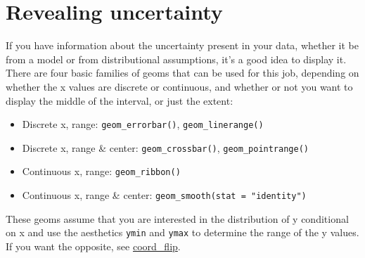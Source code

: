 \hypertarget{sec:uncertainty}{\section{Revealing
uncertainty}\label{sec:uncertainty}}

If you have information about the uncertainty present in your data,
whether it be from a model or from distributional assumptions, it's a
good idea to display it. There are four basic families of geoms that can
be used for this job, depending on whether the x values are discrete or
continuous, and whether or not you want to display the middle of the
interval, or just the extent:

\begin{itemize}
\tightlist
\item
  Discrete x, range: \texttt{geom\_errorbar()},
  \texttt{geom\_linerange()}
\item
  Discrete x, range \& center: \texttt{geom\_crossbar()},
  \texttt{geom\_pointrange()}
\item
  Continuous x, range: \texttt{geom\_ribbon()}
\item
  Continuous x, range \& center:
  \texttt{geom\_smooth(stat\ =\ "identity")}
\end{itemize}

These geoms assume that you are interested in the distribution of y
conditional on x and use the aesthetics \texttt{ymin} and \texttt{ymax}
to determine the range of the y values. If you want the opposite, see
\protect\hyperlink{sub:coord-flip}{coord\_flip}. 
  
 

\begin{Shaded}
\begin{Highlighting}[]
\StringTok{ }\NormalTok{(}\NormalTok{, }\NormalTok{, }\NormalTok{)}
\StringTok{ }\NormalTok{(} \NormalTok{:}\NormalTok{, }  \NormalTok{(}\NormalTok{, }\NormalTok{, }\NormalTok{))}

\StringTok{ } \StringTok{ } \StringTok{ }
\StringTok{ }\NormalTok{()}
\StringTok{ }\NormalTok{()}
\StringTok{ }\NormalTok{(} \NormalTok{)}
\end{Highlighting}
\end{Shaded}

